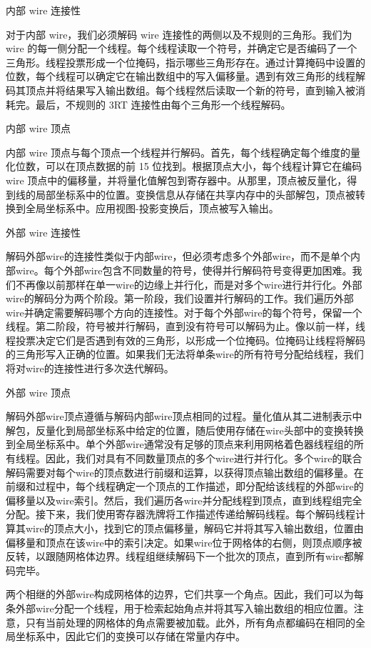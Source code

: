内部 wire 连接性

对于内部 wire，我们必须解码 wire 连接性的两侧以及不规则的三角形。我们为 wire 的每一侧分配一个线程。每个线程读取一个符号，并确定它是否编码了一个三角形。线程投票形成一个位掩码，指示哪些三角形存在。通过计算掩码中设置的位数，每个线程可以确定它在输出数组中的写入偏移量。遇到有效三角形的线程解码其顶点并将结果写入输出数组。每个线程然后读取一个新的符号，直到输入被消耗完。最后，不规则的 3RT 连接性由每个三角形一个线程解码。

内部 wire 顶点

内部 wire 顶点与每个顶点一个线程并行解码。首先，每个线程确定每个维度的量化位数，可以在顶点数据的前 15 位找到。根据顶点大小，每个线程计算它在编码 wire 顶点中的偏移量，并将量化值解包到寄存器中。从那里，顶点被反量化，得到线的局部坐标系中的位置。变换信息从存储在共享内存中的头部解包，顶点被转换到全局坐标系中。应用视图-投影变换后，顶点被写入输出。

外部 wire 连接性

解码外部wire的连接性类似于内部wire，但必须考虑多个外部wire，而不是单个内部wire。每个外部wire包含不同数量的符号，使得并行解码符号变得更加困难。我们不再像以前那样在单一wire的边缘上并行化，而是对多个wire进行并行化。外部wire的解码分为两个阶段。第一阶段，我们设置并行解码的工作。我们遍历外部wire并确定需要解码哪个方向的连接性。对于每个外部wire的每个符号，保留一个线程。第二阶段，符号被并行解码，直到没有符号可以解码为止。像以前一样，线程投票决定它们是否遇到有效的三角形，以形成一个位掩码。位掩码让线程将解码的三角形写入正确的位置。如果我们无法将单条wire的所有符号分配给线程，我们将对wire的连接性进行多次迭代解码。

外部 wire 顶点

解码外部wire顶点遵循与解码内部wire顶点相同的过程。量化值从其二进制表示中解包，反量化到局部坐标系中给定的位置，随后使用存储在wire头部中的变换转换到全局坐标系中。单个外部wire通常没有足够的顶点来利用网格着色器线程组的所有线程。因此，我们对具有不同数量顶点的多个wire进行并行化。多个wire的联合解码需要对每个wire的顶点数进行前缀和运算，以获得顶点输出数组的偏移量。在前缀和过程中，每个线程确定一个顶点的工作描述，即分配给该线程的外部wire的偏移量以及wire索引。然后，我们遍历各wire并分配线程到顶点，直到线程组完全分配。接下来，我们使用寄存器洗牌将工作描述传递给解码线程。每个解码线程计算其wire的顶点大小，找到它的顶点偏移量，解码它并将其写入输出数组，位置由偏移量和顶点在该wire中的索引决定。如果wire位于网格体的右侧，则顶点顺序被反转，以跟随网格体边界。线程组继续解码下一个批次的顶点，直到所有wire都解码完毕。

两个相继的外部wire构成网格体的边界，它们共享一个角点。因此，我们可以为每条外部wire分配一个线程，用于检索起始角点并将其写入输出数组的相应位置。注意，只有当前处理的网格体的角点需要被加载。此外，所有角点都编码在相同的全局坐标系中，因此它们的变换可以存储在常量内存中。

